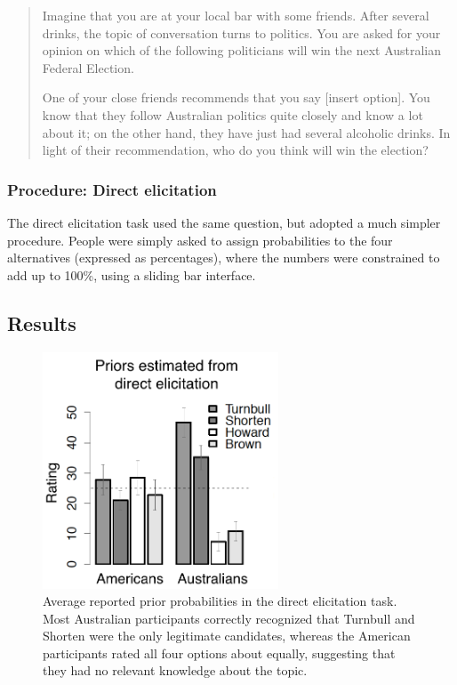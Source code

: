 \documentclass[doc]{apa6}
\begin{document}
\begin{quotation}
Imagine that you are at your local bar with some friends. After several drinks, the topic of conversation turns to politics. You are asked for your opinion on which of the following politicians will win the next Australian Federal Election.

One of your close friends recommends that you say [insert option]. You know that they follow Australian politics quite closely and know a lot about it; on the other hand, they have just had several alcoholic drinks. In light of their recommendation, who do you think will win the election?
\end{quotation}


\bigskip
\subsubsection{Procedure: Direct elicitation}

The direct elicitation task used the same question, but adopted a much simpler procedure. People were simply asked to assign probabilities to the four alternatives (expressed as percentages), where the numbers were constrained to add up to 100\%, using a sliding bar interface.

\subsection{Results}

\begin{figure}[t]
\begin{center}
\includegraphics[width=7cm]{priorsozelection.png}
\caption{\small{Average reported prior probabilities in the {\sc direct elicitation} task. Most Australian participants correctly recognized that Turnbull and Shorten were the only legitimate candidates, whereas the American participants rated all four options about equally, suggesting that they had no relevant knowledge about the topic. }}
\label{direct}
\end{center}
\end{figure}
\end{document}
